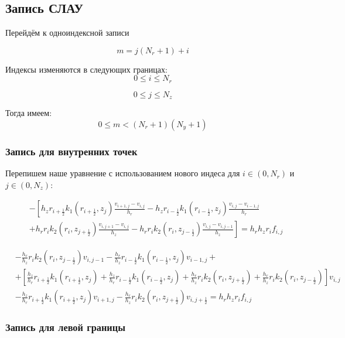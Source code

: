 \subsection{Запись СЛАУ}

Перейдём к одноиндексной записи

\[
  m = j(N_r + 1) + i
\]

Индексы изменяются в следующих границах:
\[
  0 \leq i \leq N_r
\]

\[
  0 \leq j \leq N_z
\]

Тогда имеем:
\[
  0 \leq m < (N_r + 1)(N_y + 1)
\]

\subsubsection{Запись для внутренних точек}
Перепишем наше уравнение с использованием нового индеса для $ i \in (0, N_r)$ и $ j \in (0, N_z) $:

\begin{align*}
  &- \left [ 
  h_z r_{i+\frac{1}{2}} k_1(r_{i+\frac{1}{2}}, z_j) \frac{v_{i+1, j} - v_{i, j}}{h_{r}}
  - h_z r_{i-\frac{1}{2}} k_1(r_{i-\frac{1}{2}}, z_j) \frac{v_{i, j} - v_{i - 1, j}}{h_{r}}
  \right . \\
  &\left .
  + h_r r_{i} k_2(r_i, z_{j+\frac{1}{2}}) \frac{v_{i, j + 1} - v_{i, j}}{h_{z}}
  - h_r r_{i} k_2(r_i, z_{j-\frac{1}{2}}) \frac{v_{i, j} - v_{i, j - 1}}{h_z}
  \right ]  = h_r h_z r_i f_{i, j}
\end{align*}

\begin{align*}
  & -\frac{h_r}{h_z} r_i k_2(r_i, z_{j - \frac{1}{2}}) v_{i, j - 1} - \frac{h_r}{h_z} r_{i - \frac{1}{2}} k_1(r_{i - \frac{1}{2}}, z_j) v_{i - 1, j} + \\
  & + \left[ 
    \frac{h_z}{h_r} r_{i + \frac{1}{2}} k_1(r_{i + \frac{1}{2}}, z_j) + \frac{h_z}{h_r} r_{i - \frac{1}{2}} k_1(r_{i - \frac{1}{2}}, z_j) +
    \frac{h_r}{h_z} r_i k_2 (r_i, z_{j + \frac{1}{2}}) + \frac{h_r}{h_z} r_i k_2 (r_i, z_{j-\frac{1}{2}})
   \right] v_{i, j} \\
  & - \frac{h_z}{h_r} r_{i + \frac{1}{2}} k_1(r_{i+ \frac{1}{2}}, z_j) v_{i + 1, j} - \frac{h_r}{h_z} r_i k_2(r_i, z_{j + \frac{1}{2}}) v_{i, j + \frac{1}{2}}
  = h_r h_z r_i f_{i, j}
\end{align*}

\subsubsection{Запись для левой границы}

